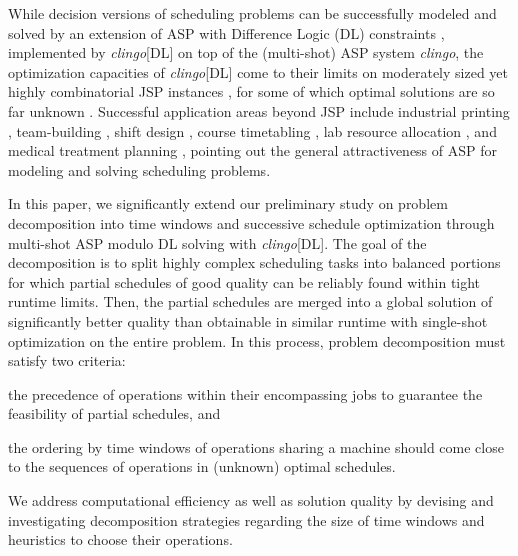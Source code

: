 \documentclass{tlp} %
\newcommand{\clingo}{\emph{clingo}\xspace}
\newcommand{\clingodl}{\emph{clingo}[DL]\xspace}
\begin{document}
While decision versions of scheduling problems can be successfully modeled and
solved by an extension of ASP with Difference Logic (DL) constraints
\citep{gebser2016theory}, implemented by \clingodl on top of the
(multi-shot) ASP system \clingo \citep{gekakasc17a},
the optimization capacities of \clingodl come to their limits on moderately sized
yet highly combinatorial JSP instances \citep{elkgeb20a}, for some of which optimal solutions are so far unknown \citep{shysha18a}.
Successful application areas beyond JSP include 
industrial printing \citep{balduccini11a},
team-building \citep{rigralmaliiile12a},
shift design \citep{abseher2016shift},
course timetabling \citep{bainkaokscsotawa18a},
lab resource allocation \citep{francescutto2021solving},
and
medical treatment planning \citep{dogagrmamopo21a},
pointing out the general attractiveness of ASP for modeling and solving scheduling problems.

In this paper, we significantly extend our preliminary study \citep{elkgeb20a} 
on problem decomposition into time windows and successive schedule optimization
through multi-shot ASP modulo DL solving with \clingodl.
The goal of the decomposition is to split highly complex scheduling tasks into
balanced portions for which partial schedules of good quality can be reliably
found within tight runtime limits. Then, the partial schedules are merged into a global solution of significantly better quality than obtainable in similar runtime with single-shot optimization on the entire problem.
In this process, problem decomposition must satisfy two criteria: 
\begin{enumerate*}[label=\emph{(\roman*)}]
  \item the precedence of operations within their encompassing jobs to guarantee the feasibility of partial schedules, and 
  \item the ordering by time windows of operations sharing a machine should come close to the sequences of operations in (unknown) optimal schedules.
\end{enumerate*}
We address computational efficiency as well as solution quality by devising and investigating decomposition strategies regarding the size of
time windows and heuristics to choose their operations.
\end{document}
